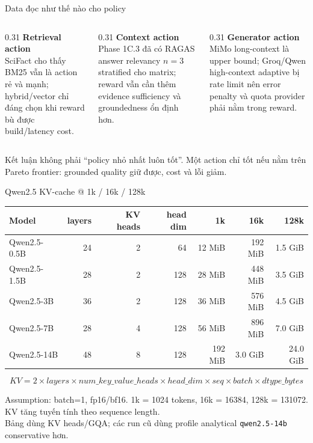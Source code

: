 \documentclass[aspectratio=169,10pt]{beamer}
\newcommand{\code}[1]{\texttt{\footnotesize #1}}
\newcommand{\minihead}[1]{{\bfseries\color{AccentDark}#1}}
\newcommand{\takeaway}[1]{%
  \vspace{0.46em}
  \noindent\colorbox{Soft}{%
    \parbox{\dimexpr\linewidth-2\fboxsep}{\color{Ink}\strut #1\strut}%
  }%
}
\begin{document}
\begin{frame}{Data đọc như thế nào cho policy}
  \small
  \begin{columns}[T,onlytextwidth]
    \begin{column}{0.31\textwidth}
      \minihead{Retrieval action}\\
      \color{Muted}SciFact cho thấy BM25 vẫn là action rẻ và mạnh; hybrid/vector chỉ đáng chọn khi reward bù được build/latency cost.
    \end{column}
    \begin{column}{0.31\textwidth}
      \minihead{Context action}\\
      \color{Muted}Phase 1C.3 đã có RAGAS answer relevancy \(n=3\) stratified cho matrix; reward vẫn cần thêm evidence sufficiency và groundedness ổn định hơn.
    \end{column}
    \begin{column}{0.31\textwidth}
      \minihead{Generator action}\\
      \color{Muted}MiMo long-context là upper bound; Groq/Qwen high-context adaptive bị rate limit nên error penalty và quota provider phải nằm trong reward.
    \end{column}
  \end{columns}
  \takeaway{\small Kết luận không phải ``policy nhỏ nhất luôn tốt''. Một action chỉ tốt nếu nằm trên Pareto frontier: grounded quality giữ được, cost và lỗi giảm.}
\end{frame}

\begin{frame}{Qwen2.5 KV-cache @ 1k / 16k / 128k}
  \scriptsize
  \centering
  \setlength{\tabcolsep}{4.0pt}
  \renewcommand{\arraystretch}{1.17}
  \begin{tabular}{l r r r r r r}
    \toprule
    Model & layers & KV heads & head dim & 1k & 16k & 128k \\
    \midrule
    Qwen2.5-0.5B & 24 & 2 & 64 & 12 MiB & 192 MiB & 1.5 GiB \\
    Qwen2.5-1.5B & 28 & 2 & 128 & 28 MiB & 448 MiB & 3.5 GiB \\
    Qwen2.5-3B & 36 & 2 & 128 & 36 MiB & 576 MiB & 4.5 GiB \\
    Qwen2.5-7B & 28 & 4 & 128 & 56 MiB & 896 MiB & 7.0 GiB \\
    Qwen2.5-14B & 48 & 8 & 128 & 192 MiB & 3.0 GiB & 24.0 GiB \\
    \bottomrule
  \end{tabular}

  \vspace{0.40cm}
  \footnotesize
  \[
    KV = 2 \times layers \times num\_key\_value\_heads \times head\_dim \times seq \times batch \times dtype\_bytes
  \]
  \vspace{-0.12cm}
  \begin{minipage}{0.88\textwidth}
    \scriptsize\color{Muted}
    Assumption: batch=1, fp16/bf16. 1k = 1024 tokens, 16k = 16384, 128k = 131072. KV tăng tuyến tính theo sequence length.\\
    Bảng dùng KV heads/GQA; các run cũ dùng profile analytical \code{qwen2.5-14b} conservative hơn.
  \end{minipage}
\end{frame}
\end{document}
